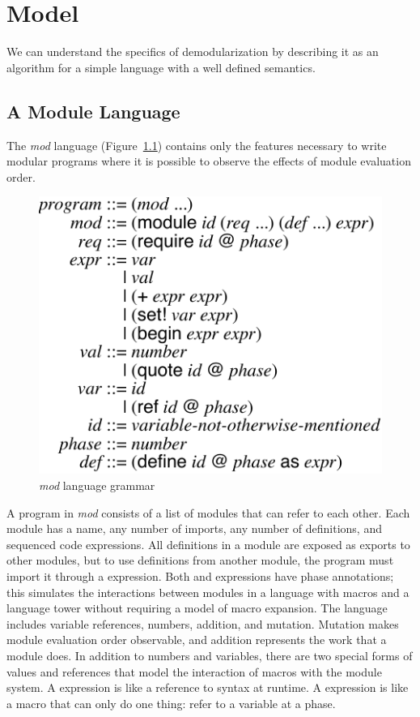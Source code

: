 \chapter{Model}
\label{chap:model}

We can understand the specifics of demodularization by describing it as an algorithm for a simple language with a well defined semantics.

\section{A Module Language}
The \emph{mod} language (Figure~\ref{fig:source-lang}) contains only the features necessary to write modular programs where it is possible to observe the effects of module evaluation order.

\begin{figure}[h]
\centering
\includegraphics{figures/source}
\caption{\emph{mod} language grammar}
\label{fig:source-lang}
\end{figure}

A program in \emph{mod} consists of a list of modules that can refer to each other.
Each module has a name, any number of imports, any number of definitions, and sequenced code expressions. 
All definitions in a module are exposed as exports to other modules, but to use definitions from another module, the program must import it through a  expression.
Both  and  expressions have phase annotations; this simulates the interactions between modules in a language with macros and a language tower without requiring a model of macro expansion.
The language includes variable references, numbers, addition, and mutation.
Mutation makes module evaluation order observable, and addition represents the work that a module does.
In addition to numbers and variables, there are two special forms of values and references that model the interaction of macros with the module system.
A  expression is like a reference to syntax at runtime.
A  expression is like a macro that can only do one thing: refer to a variable at a phase.

